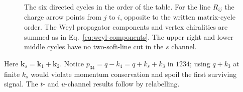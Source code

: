 \documentclass[a4paper,12pt]{article}
\newcommand{\bk}{\bm k}
\begin{document}
\begin{figure}[ht]
\centering
{}
\caption{The six directed cycles in the order of the table. For the line $R_{ij}$ the charge arrow points from $j$ to $i$, opposite to
the written matrix-cycle order. The Weyl propagator components and vertex chiralities
are summed as in Eq.~\eqref{eq:weyl-components}. The upper right and lower
middle cycles have no two-soft-line cut in the $s$ channel.}
\end{figure}
Here $\bk_s=\bk_1+\bk_2$. Notice $p_{34}=q-k_4=q+k_s+k_3$ in $1234$;
using $q+k_3$ at finite $k_s$ would violate momentum conservation and spoil the
first surviving signal. The $t$- and $u$-channel results follow by relabelling.
\end{document}
